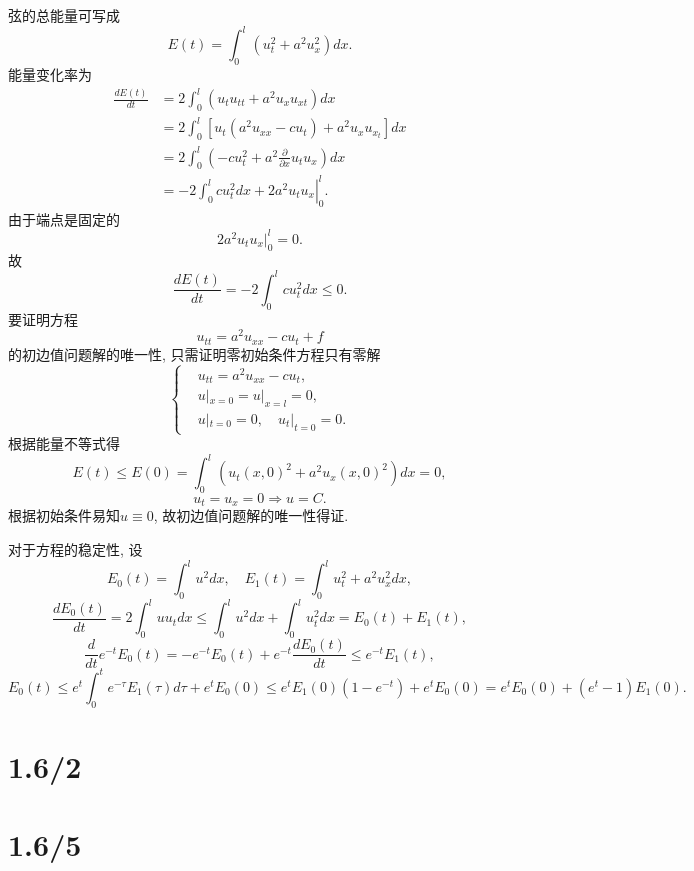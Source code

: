\documentclass[11pt,a4paper]{article}
\begin{document}
弦的总能量可写成
$$E(t)=\int_0^l(u_t^2+a^2u_x^2)dx.$$
能量变化率为
\begin{align*}
  \frac{dE(t)}{dt}
  &=2\int_0^l\left(u_tu_{tt}+a^2u_{x}u_{xt}\right)dx\\
  &=2\int_0^l\left[u_t\left(a^2u_{xx}-cu_t\right)+a^2u_xu_{x_t}\right]dx\\
  &=2\int_0^l\left(-cu_t^2+a^2\frac{\partial}{\partial x}u_tu_x\right)dx\\
  &=\left.-2\int_0^lcu_t^2dx+2a^2u_tu_x\right|_0^l.
\end{align*}
由于端点是固定的
$$2a^2u_tu_x\bigg|_0^l=0.$$
故
$$\frac{dE(t)}{dt}=-2\int_0^lcu_t^2dx\leqslant 0.$$
要证明方程
$$u_{tt}=a^2u_{xx}-cu_t+f$$
的初边值问题解的唯一性, 只需证明零初始条件方程只有零解
$$\left\{\begin{aligned}
   & u_{tt}=a^2u_{xx}-cu_t,                                      \\
   & u|_{x=0}=u|_{x=l}=0,\\
   & u|_{t=0}=0,\quad u_t|_{t=0}=0.
\end{aligned}\right.$$
根据能量不等式得$$E(t)\leqslant E(0)=\int_0^l\left(u_t(x,0)^2+a^2u_x(x,0)^2\right)dx=0,$$
$$u_t=u_x=0\Longrightarrow u=C.$$
根据初始条件易知$u\equiv0$, 故初边值问题解的唯一性得证.

对于方程的稳定性, 设
$$E_0(t)=\int_0^lu^2dx,\quad E_1(t)=\int_0^lu_t^2+a^2u_x^2dx,$$
$$\frac{dE_0(t)}{dt}=2\int_0^luu_tdx\leqslant\int_0^lu^2dx+\int_0^lu_t^2dx=E_0(t)+E_1(t),$$
$$\frac{d}{dt}e^{-t}E_0(t)=-e^{-t}E_0(t)+e^{-t}\frac{dE_0(t)}{dt}\leqslant e^{-t}E_1(t),$$
$$E_0(t)\leqslant e^t\int_0^t e^{-\tau}E_1(\tau)d\tau+e^t E_0(0)\leqslant e^tE_1(0)(1-{e^{-t}})+e^t E_0(0)=e^tE_0(0)+(e^t-1)E_1(0).$$

\section{1.6/2}
\section{1.6/5}
\end{document}
